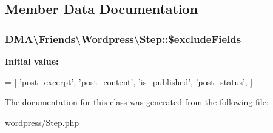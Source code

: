 \subsection{Member Data Documentation}
\hypertarget{classDMA_1_1Friends_1_1Wordpress_1_1Step_aa320e2b0f3f4a24c3cea41e133fd1145}{
\subsubsection[{\$exclude\-Fields}]{\setlength{\rightskip}{0pt plus 5cm}D\-M\-A\textbackslash{}\-Friends\textbackslash{}\-Wordpress\textbackslash{}\-Step\-::\$exclude\-Fields\hspace{0.3cm}{\ttfamily [protected]}}}\label{classDMA_1_1Friends_1_1Wordpress_1_1Step_aa320e2b0f3f4a24c3cea41e133fd1145}
{\bfseries Initial value\-:}
\begin{DoxyCode}
= [ 
        \textcolor{stringliteral}{'post\_excerpt'},
        \textcolor{stringliteral}{'post\_content'},
        \textcolor{stringliteral}{'is\_published'},
        \textcolor{stringliteral}{'post\_status'},
    ]
\end{DoxyCode}


The documentation for this class was generated from the following file\-:\begin{DoxyCompactItemize}
\item 
wordpress/Step.\-php\end{DoxyCompactItemize}
